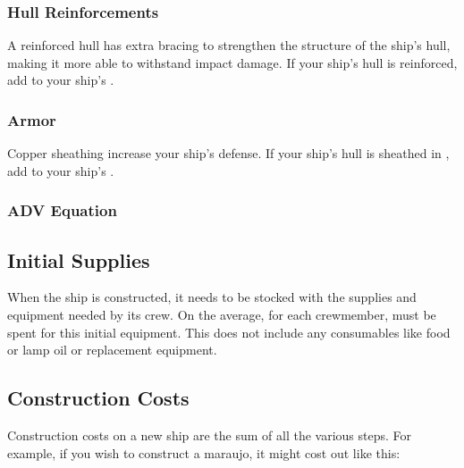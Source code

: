 \begin{multicols*}{2}
\subsubsection{Hull Reinforcements}
A reinforced hull has extra bracing to strengthen the structure of the ship's hull, making it more able to withstand impact damage. If your ship's hull is reinforced, add  to your ship's \ADV.
\subsubsection{Armor}
Copper sheathing increase your ship's defense. If your ship's hull is sheathed in , add  to your ship's \ADV.
\subsubsection{ADV Equation}
\leavevmode\hphantom{\vphantom{.}}
\begin{normboxc}
\label{armor defense value!equation}

\end{normboxc}
\subsection{Initial Supplies}
When the ship is constructed, it needs to be stocked with the supplies and equipment needed by its crew. On the average, for each crewmember, \tcdefine{200 sp} must be spent for this initial equipment. This does not include any consumables like food or lamp oil or replacement equipment.
\subsection{Construction Costs}
Construction costs on a new ship are the sum of all
the various steps. For example, if you wish to construct a
maraujo, it might cost out like this:





\end{multicols*}
